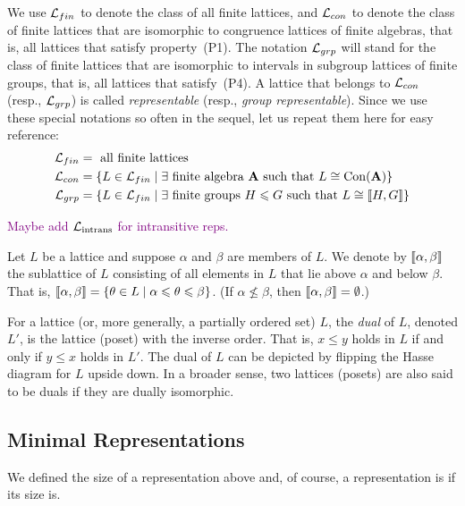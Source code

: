We use $\mathcal{L}_{fin}$ to denote the class of all finite lattices, and 
$\mathcal{L}_{con}$ to denote the class of finite lattices that are isomorphic to congruence
lattices of finite algebras, that is, all lattices that satisfy property~(P1). 
The notation 
$\mathcal{L}_{grp}$ will stand for the class of finite lattices that
are isomorphic to intervals in subgroup lattices of finite groups, that is,
all lattices that satisfy~(P4). 
A lattice that belongs to $\mathcal{L}_{con}$ (resp., $\mathcal{L}_{grp}$) is called \emph{representable} (resp., 
\emph{group representable}).
Since we use these special notations so often in the sequel, let us repeat them here for easy reference:
\begin{align*}
  \sL_{fin} & = \text{ all finite lattices }\\
  \sL_{con} %
  &=\{L \in \sL_{fin} \mid \exists \text{ finite algebra $\bA$ such that $L \cong \Con(\bA)$}\}\\
  \sL_{grp} %
  &=\{L \in \sL_{fin} \mid \exists \text{ finite groups $H \leq G$ such that $L \cong \lb H, G\rb$}\}
\end{align*}

\textcolor{purple}{Maybe add $\mathcal{L}_{\text{intrans}}$ for intransitive reps.}

Let $L$ be a lattice and suppose $\alpha$ and $\beta$ are members of $L$.  
We denote by $\llbracket \alpha, \beta \rrbracket$ the sublattice of $L$ consisting of all
elements in $L$ that lie above $\alpha$ and below $\beta$.  
That is, 
$\llbracket \alpha, \beta \rrbracket = 
\{\theta \in L \mid \alpha \leqslant \theta \leqslant \beta\}$.
(If $\alpha \nleq \beta$, then $\llbracket \alpha, \beta \rrbracket = \emptyset$.)

For a lattice (or, more generally, a partially ordered set) 
$L$, the \emph{dual} of $L$, denoted
$L'$, is the lattice (poset) with the inverse order. That is, 
$x \leq y$ holds in $L$ if and only if $y \leq x$ holds in $L'$. 
The dual of $L$ can be depicted by flipping the Hasse diagram
for $L$ upside down. 
In a broader sense, two lattices (posets) are also said to be duals if they are
dually isomorphic.

\subsection{Minimal Representations}
\label{sec:minim-repr}
We defined the size of a representation above and, of course, a representation is
 if its size is.


